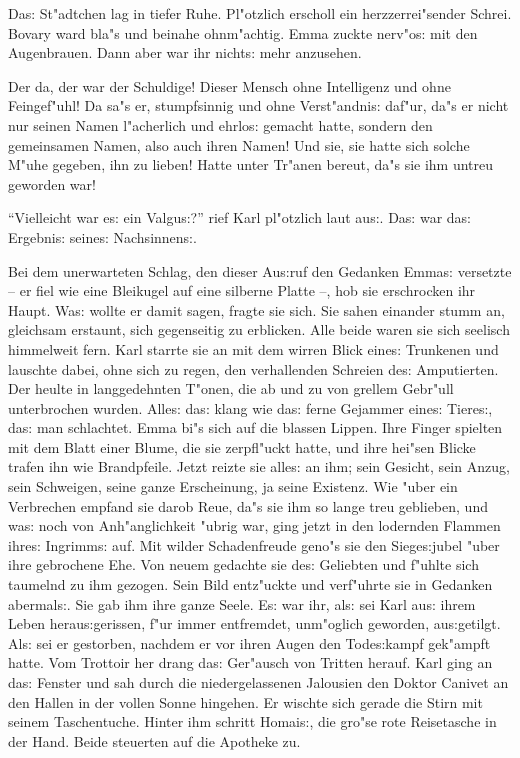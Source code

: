 \documentclass[oneside,12pt]{book}
\newcommand{\s}{s:}%
\begin{document}
Da{\s} St"adtchen lag in tiefer Ruhe. Pl"otzlich erscholl ein
herzzerrei"sender Schrei. Bovary ward bla"s und beinahe ohnm"achtig.
Emma zuckte nerv"o{\s} mit den Augenbrauen. Dann aber war ihr
nicht{\s} mehr anzusehen.

Der da, der war der Schuldige! Dieser Mensch ohne Intelligenz und
ohne Feingef"uhl! Da sa"s er, stumpfsinnig und ohne Verst"andni{\s}
daf"ur, da"s er nicht nur seinen Namen l"acherlich und ehrlo{\s}
gemacht hatte, sondern den gemeinsamen Namen, also auch ihren
Namen! Und sie, sie hatte sich solche M"uhe gegeben, ihn zu lieben!
Hatte unter Tr"anen bereut, da"s sie ihm untreu geworden war!

"`Vielleicht war e{\s} ein Valgu{\s}?"' rief Karl pl"otzlich laut
au{\s}. Da{\s} war da{\s} Ergebni{\s} seine{\s} Nachsinnen{\s}.

Bei dem unerwarteten Schlag, den dieser Au{\s}ruf den Gedanken
Emma{\s} versetzte -- er fiel wie eine Bleikugel auf eine silberne
Platte --, hob sie erschrocken ihr Haupt. Wa{\s} wollte er damit
sagen, fragte sie sich. Sie sahen einander stumm an, gleichsam
erstaunt, sich gegenseitig zu erblicken. Alle beide waren sie sich
seelisch himmelweit fern. Karl starrte sie an mit dem wirren Blick
eine{\s} Trunkenen und lauschte dabei, ohne sich zu regen, den
verhallenden Schreien de{\s} Amputierten. Der heulte in
langgedehnten T"onen, die ab und zu von grellem Gebr"ull
unterbrochen wurden. Alle{\s} da{\s} klang wie da{\s} ferne
Gejammer eine{\s} Tiere{\s}, da{\s} man schlachtet. Emma bi"s sich
auf die blassen Lippen. Ihre Finger spielten mit dem Blatt einer
Blume, die sie zerpfl"uckt hatte, und ihre hei"sen Blicke trafen
ihn wie Brandpfeile. Jetzt reizte sie alle{\s} an ihm; sein
Gesicht, sein Anzug, sein Schweigen, seine ganze Erscheinung, ja
seine Existenz. Wie "uber ein Verbrechen empfand sie darob Reue,
da"s sie ihm so lange treu geblieben, und wa{\s} noch von
Anh"anglichkeit "ubrig war, ging jetzt in den lodernden Flammen
ihre{\s} Ingrimm{\s} auf. Mit wilder Schadenfreude geno"s sie den
Siege{\s}jubel "uber ihre gebrochene Ehe. Von neuem gedachte sie
de{\s} Geliebten und f"uhlte sich taumelnd zu ihm gezogen. Sein
Bild ent\/z"uckte und verf"uhrte sie in Gedanken abermal{\s}. Sie
gab ihm ihre ganze Seele. E{\s} war ihr, al{\s} sei Karl au{\s}
ihrem Leben herau{\s}gerissen, f"ur immer entfremdet, unm"oglich
geworden, au{\s}getilgt. Al{\s} sei er gestorben, nachdem er vor
ihren Augen den Tode{\s}kampf gek"ampft hatte. Vom Trottoir her
drang da{\s} Ger"ausch von Tritten herauf. Karl ging an da{\s}
Fenster und sah durch die niedergelassenen Jalousien den Doktor
Canivet an den Hallen in der vollen Sonne hingehen. Er wischte
sich gerade die Stirn mit seinem Taschentuche. Hinter ihm schritt
Homai{\s}, die gro"se rote Reisetasche in der Hand. Beide
steuerten auf die Apotheke zu.
\end{document}
